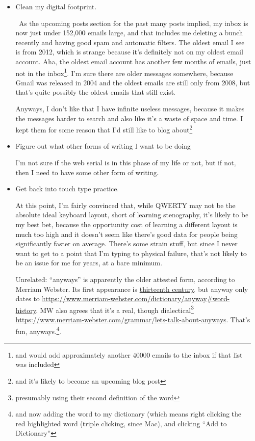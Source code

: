 \documentclass[12pt]{article}
\newcommand{\say}[1]{``#1''}
\renewcommand{\,}{\textsuperscript{,}}
\begin{document}
\begin{itemize}

\item Clean my digital footprint.

 As the upcoming posts section for the past many posts implied, my inbox is now just under 152,000 emails large, and that includes me deleting a bunch recently and having good spam and automatic filters.  
The oldest email I see is from 2012, which is strange because it's definitely not on my oldest email account.  
Aha, the oldest email account has another few months of emails, just not in the inbox\footnote{and would add approximately another 40000 emails to the inbox if that list was included}.  
I'm sure there are older messages somewhere, because Gmail was released in 2004 and the oldest emails are still only from 2008, but that's quite possibly the oldest emails that still exist.

Anyways, I don't like that I have infinite useless messages, because it makes the messages harder to search and also like it's a waste of space and time.  
I kept them for some reason that I'd still like to blog about\footnote{and it's likely to become an upcoming blog post}

\item Figure out what other forms of writing I want to be doing

I'm not sure if the web serial is in this phase of my life or not, but if not, then I need to have some other form of writing.

\item Get back into touch type practice.

At this point, I'm fairly convinced that, while QWERTY may not be the absolute ideal keyboard layout, short of learning stenography, it's likely to be my best bet, because the opportunity cost of learning a different layout is much too high and it doesn't seem like there's good data for people being significantly faster on average.  
There's some strain stuff, but since I never want to get to a point that I'm typing to physical failure, that's not likely to be an issue for me for years, at a bare minimum.

Unrelated: \say{anyways} is apparently the older attested form, according to Merriam Webster. Its first appearance is \href{https://www.merriam-webster.com/dictionary/anyways#word-history}{thirteenth century}, but anyway only dates to \href{fourteenth}{https://www.merriam-webster.com/dictionary/anyway#word-history}.  
MW also agrees that it's a real, though dialectical\footnote{presumably using their second definition of the word} \href{word}{https://www.merriam-webster.com/grammar/lets-talk-about-anyways}.  
That's fun, anyways.\footnote{and now adding the word to my dictionary (which means right clicking the red highlighted word (triple clicking, since Mac), and clicking \say{Add to Dictionary}}.


\end{itemize}
\end{document}
